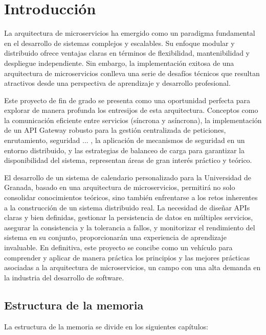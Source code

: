 \chapter{Introducción}\label{cap:introduccion}

La arquitectura de microservicios ha emergido como un paradigma fundamental en el desarrollo de sistemas complejos y escalables. Su enfoque modular y distribuido ofrece ventajas claras en términos de flexibilidad, mantenibilidad y despliegue independiente. Sin embargo, la implementación exitosa de una arquitectura de microservicios conlleva una serie de desafíos técnicos que resultan atractivos desde una perspectiva de aprendizaje y desarrollo profesional.

Este proyecto de fin de grado se presenta como una oportunidad perfecta para explorar de manera profunda los entresijos de esta arquitectura. Conceptos como la comunicación eficiente entre servicios (síncrona y asíncrona), la implementación de un API Gateway robusto para la gestión centralizada de peticiones, enrutamiento, seguridad ... , la aplicación de mecanismos de seguridad en un entorno distribuido, y las estrategias de balanceo de carga para garantizar la disponibilidad del sistema, representan áreas de gran interés práctico y teórico.

El desarrollo de un sistema de calendario personalizado para la Universidad de Granada, basado en una arquitectura de microservicios, permitirá no solo consolidar conocimientos teóricos, sino también enfrentarse a los retos inherentes a la construcción de un sistema distribuido real. La necesidad de diseñar APIs claras y bien definidas, gestionar la persistencia de datos en múltiples servicios, asegurar la consistencia y la tolerancia a fallos, y monitorizar el rendimiento del sistema en su conjunto, proporcionarán una experiencia de aprendizaje invaluable. En definitiva, este proyecto se concibe como un vehículo para comprender y aplicar de manera práctica los principios y las mejores prácticas asociadas a la arquitectura de microservicios, un campo con una alta demanda en la industria del desarrollo de software.

\section{Estructura de la memoria}

La estructura de la memoria se divide en los siguientes capítulos:

